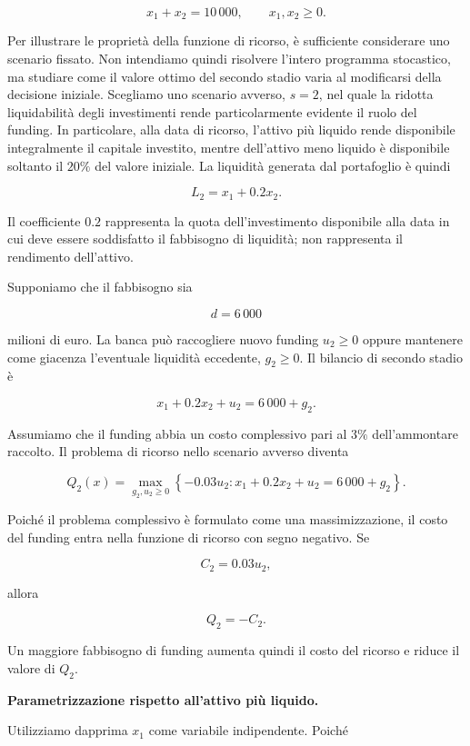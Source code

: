 \[
x_1+x_2=10\,000,
\qquad
x_1,x_2\geq0.
\]

Per illustrare le propriet\`{a} della funzione di ricorso,
\`{e} sufficiente considerare uno scenario fissato.
Non intendiamo quindi risolvere l'intero programma
stocastico, ma studiare come il valore ottimo del
secondo stadio varia al modificarsi della decisione
iniziale. Scegliamo uno scenario avverso, $s=2$, nel quale
la ridotta liquidabilit\`{a} degli investimenti rende
particolarmente evidente il ruolo del funding. In particolare, alla data di ricorso, l'attivo
pi\`u liquido rende disponibile integralmente il capitale investito, mentre
dell'attivo meno liquido \`e disponibile soltanto il $20\%$ del valore
iniziale. La liquidit\`a generata dal portafoglio \`e quindi

\[
L_2
=
x_1+0.2x_2.
\]

Il coefficiente $0.2$ rappresenta la quota dell'investimento disponibile
alla data in cui deve essere soddisfatto il fabbisogno di liquidit\`a; non
rappresenta il rendimento dell'attivo.

Supponiamo che il fabbisogno sia

\[
d=6\,000
\]

\noindent milioni di euro. La banca pu\`o raccogliere nuovo funding $u_2\geq0$ oppure
mantenere come giacenza l'eventuale liquidit\`a eccedente, $g_2\geq0$. Il
bilancio di secondo stadio \`e

\[
x_1+0.2x_2+u_2
=
6\,000+g_2.
\]

Assumiamo che il funding abbia un costo complessivo pari al $3\%$
dell'ammontare raccolto. Il problema di ricorso nello scenario avverso
diventa

\[
Q_2(x)
=
\max_{g_2,u_2\geq0}
\left\{
-0.03u_2:
x_1+0.2x_2+u_2=6\,000+g_2
\right\}.
\]

Poich\'e il problema complessivo \`e formulato come una massimizzazione, il
costo del funding entra nella funzione di ricorso con segno negativo. Se

\[
C_2=0.03u_2,
\]

\noindent allora

\[
Q_2=-C_2.
\]

Un maggiore fabbisogno di funding aumenta quindi il costo del ricorso e
riduce il valore di $Q_2$.

\medskip

\noindent
\textbf{Parametrizzazione rispetto all'attivo pi\`u liquido.}

Utilizziamo dapprima $x_1$ come variabile indipendente. Poich\'e

